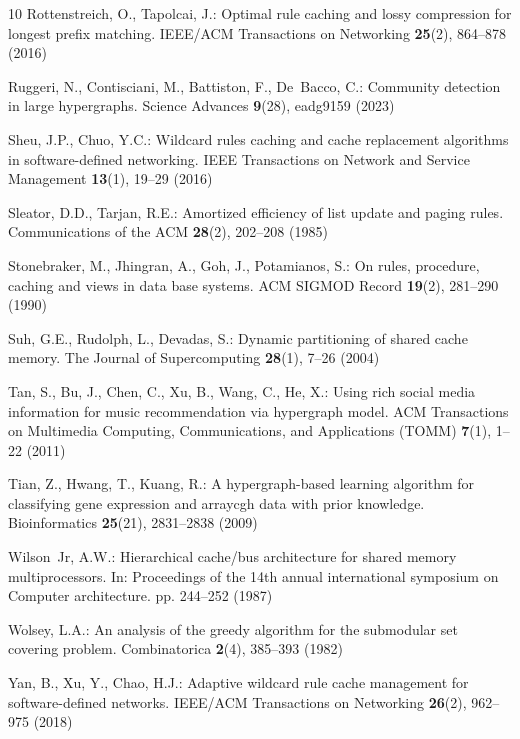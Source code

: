 \documentclass[11pt]{article}
\begin{document}
\begin{thebibliography}{10}
Rottenstreich, O., Tapolcai, J.: Optimal rule caching and lossy compression for
  longest prefix matching. IEEE/ACM Transactions on Networking  \textbf{25}(2),
   864--878 (2016)

Ruggeri, N., Contisciani, M., Battiston, F., De~Bacco, C.: Community detection
  in large hypergraphs. Science Advances  \textbf{9}(28),  eadg9159 (2023)

Sheu, J.P., Chuo, Y.C.: Wildcard rules caching and cache replacement algorithms
  in software-defined networking. IEEE Transactions on Network and Service
  Management  \textbf{13}(1),  19--29 (2016)

Sleator, D.D., Tarjan, R.E.: Amortized efficiency of list update and paging
  rules. Communications of the ACM  \textbf{28}(2),  202--208 (1985)

Stonebraker, M., Jhingran, A., Goh, J., Potamianos, S.: On rules, procedure,
  caching and views in data base systems. ACM SIGMOD Record  \textbf{19}(2),
  281--290 (1990)

Suh, G.E., Rudolph, L., Devadas, S.: Dynamic partitioning of shared cache
  memory. The Journal of Supercomputing  \textbf{28}(1),  7--26 (2004)

Tan, S., Bu, J., Chen, C., Xu, B., Wang, C., He, X.: Using rich social media
  information for music recommendation via hypergraph model. ACM Transactions
  on Multimedia Computing, Communications, and Applications (TOMM)
  \textbf{7}(1),  1--22 (2011)

Tian, Z., Hwang, T., Kuang, R.: A hypergraph-based learning algorithm for
  classifying gene expression and arraycgh data with prior knowledge.
  Bioinformatics  \textbf{25}(21),  2831--2838 (2009)

Wilson~Jr, A.W.: Hierarchical cache/bus architecture for shared memory
  multiprocessors. In: Proceedings of the 14th annual international symposium
  on Computer architecture. pp. 244--252 (1987)

Wolsey, L.A.: An analysis of the greedy algorithm for the submodular set
  covering problem. Combinatorica  \textbf{2}(4),  385--393 (1982)

Yan, B., Xu, Y., Chao, H.J.: Adaptive wildcard rule cache management for
  software-defined networks. IEEE/ACM Transactions on Networking
  \textbf{26}(2),  962--975 (2018)


\end{thebibliography}
\end{document}

